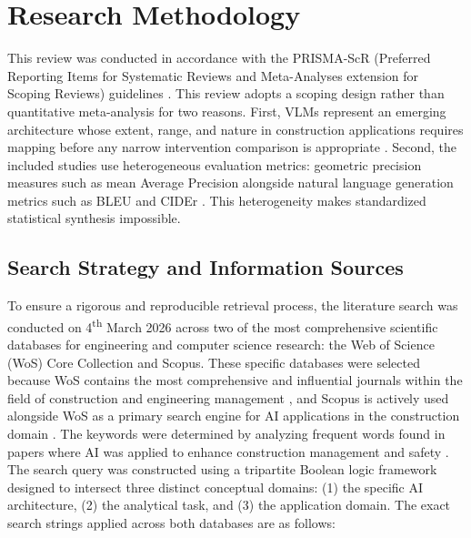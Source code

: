 \documentclass[10pt,letterpaper]{article}
\begin{document}
\section{Research Methodology}

This review was conducted in accordance with the PRISMA-ScR (Preferred Reporting Items for Systematic Reviews and Meta-Analyses extension for Scoping Reviews) guidelines \cite{tricco2018}. This review adopts a scoping design rather than quantitative meta-analysis for two reasons. First, VLMs represent an emerging architecture whose extent, range, and nature in construction applications requires mapping before any narrow intervention comparison is appropriate \cite{chan2025,chen2024}. Second, the included studies use heterogeneous evaluation metrics: geometric precision measures such as mean Average Precision \cite{nath2020,wang2024} alongside natural language generation metrics such as BLEU and CIDEr \cite{jung2024,xiao2022}. This heterogeneity makes standardized statistical synthesis impossible.

\subsection{Search Strategy and Information Sources}

To ensure a rigorous and reproducible retrieval process, the literature search was conducted on 4\textsuperscript{th} March 2026 across two of the most comprehensive scientific databases for engineering and computer science research: the Web of Science (WoS) Core Collection and Scopus. These specific databases were selected because WoS contains the most comprehensive and influential journals within the field of construction and engineering management \cite{zhong2019}, and Scopus is actively used alongside WoS as a primary search engine for AI applications in the construction domain \cite{rabbi2024}. The keywords were determined by analyzing frequent words found in papers where AI was applied to enhance construction management and safety \cite{rabbi2024}. The search query was constructed using a tripartite Boolean logic framework designed to intersect three distinct conceptual domains: (1) the specific AI architecture, (2) the analytical task, and (3) the application domain. The exact search strings applied across both databases are as follows:
\end{document}
